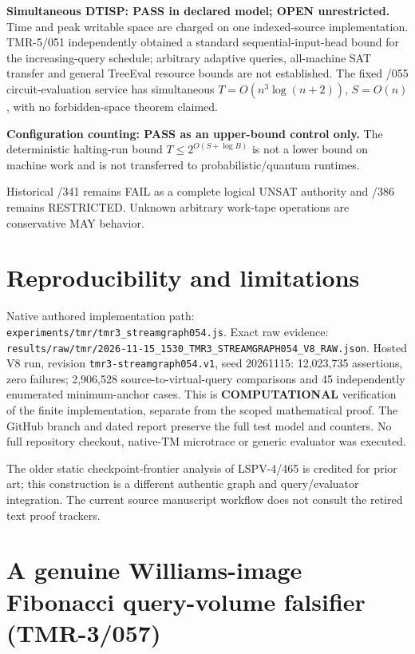 \documentclass[11pt]{article}
\begin{document}
\noindent\textbf{Simultaneous DTISP: PASS in declared model; 
OPEN unrestricted.} Time and peak writable space are charged 
on one indexed-source implementation. TMR-5/051 independently obtained a standard sequential-input-head
bound for the increasing-query schedule; arbitrary adaptive
queries, all-machine SAT transfer and general TreeEval resource
bounds are not established. The fixed /055 circuit-evaluation
service has simultaneous $T=O(n^3\log(n+2))$, $S=O(n)$,
with no forbidden-space theorem claimed.

\noindent\textbf{Configuration counting: PASS as an upper-bound 
control only.} The deterministic halting-run bound 
$T\le2^{O(S+\log B)}$ is not a lower bound on machine work
and is not transferred to probabilistic/quantum runtimes.

Historical /341 remains FAIL as a complete logical UNSAT 
authority and /386 remains RESTRICTED. Unknown arbitrary 
work-tape operations are conservative MAY behavior.

\section{Reproducibility and limitations}
Native authored implementation path: 
\texttt{experiments/tmr/tmr3\_streamgraph054.js}. 
Exact raw evidence: 
\texttt{results/raw/tmr/2026-11-15\_1530\_TMR3\_STREAMGRAPH054\_V8\_RAW.json}. 
Hosted V8 run, revision \texttt{tmr3-streamgraph054.v1}, 
seed 20261115: 12,023,735 assertions, zero failures; 
2,906,528 source-to-virtual-query comparisons and 
45 independently enumerated minimum-anchor cases. 
This is \textbf{COMPUTATIONAL} verification of the finite 
implementation, separate from the scoped mathematical proof.
The GitHub branch and dated report preserve the full 
test model and counters. No full repository checkout, 
native-TM microtrace or generic evaluator was executed.

The older static checkpoint-frontier analysis of 
LSPV-4/465 is credited for prior art; this construction 
is a different authentic graph and query/evaluator 
integration. The current source manuscript workflow does
not consult the retired text proof trackers.

\section{A genuine Williams-image Fibonacci query-volume falsifier (TMR-3/057)}
\end{document}
